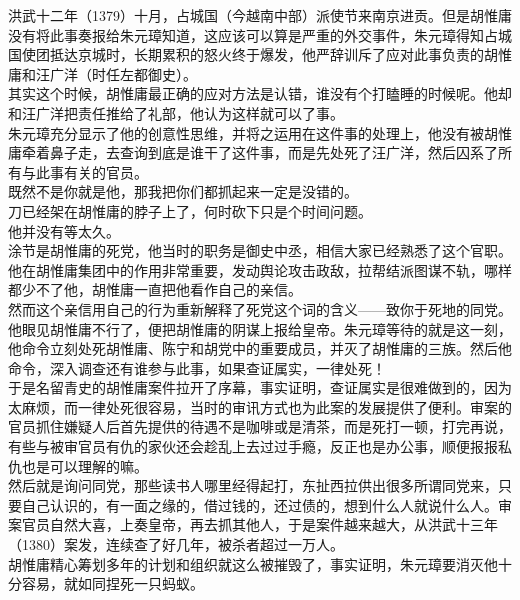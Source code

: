 \begin{multicols}{\theparacolNo}
洪武十二年（1379）十月，占城国（今越南中部）派使节来南京进贡。但是胡惟庸没有将此事奏报给朱元璋知道，这应该可以算是严重的外交事件，朱元璋得知占城国使团抵达京城时，长期累积的怒火终于爆发，他严辞训斥了应对此事负责的胡惟庸和汪广洋（时任左都御史）。\\

其实这个时候，胡惟庸最正确的应对方法是认错，谁没有个打瞌睡的时候呢。他却和汪广洋把责任推给了礼部，他认为这样就可以了事。\\

朱元璋充分显示了他的创意性思维，并将之运用在这件事的处理上，他没有被胡惟庸牵着鼻子走，去查询到底是谁干了这件事，而是先处死了汪广洋，然后囚系了所有与此事有关的官员。\\

既然不是你就是他，那我把你们都抓起来一定是没错的。\\

刀已经架在胡惟庸的脖子上了，何时砍下只是个时间问题。\\

他并没有等太久。\\

涂节是胡惟庸的死党，他当时的职务是御史中丞，相信大家已经熟悉了这个官职。他在胡惟庸集团中的作用非常重要，发动舆论攻击政敌，拉帮结派图谋不轨，哪样都少不了他，胡惟庸一直把他看作自己的亲信。\\

然而这个亲信用自己的行为重新解释了死党这个词的含义——致你于死地的同党。\\

他眼见胡惟庸不行了，便把胡惟庸的阴谋上报给皇帝。朱元璋等待的就是这一刻，他命令立刻处死胡惟庸、陈宁和胡党中的重要成员，并灭了胡惟庸的三族。然后他命令，深入调查还有谁参与此事，如果查证属实，一律处死！\\

于是名留青史的胡惟庸案件拉开了序幕，事实证明，查证属实是很难做到的，因为太麻烦，而一律处死很容易，当时的审讯方式也为此案的发展提供了便利。审案的官员抓住嫌疑人后首先提供的待遇不是咖啡或是清茶，而是死打一顿，打完再说，有些与被审官员有仇的家伙还会趁乱上去过过手瘾，反正也是办公事，顺便报报私仇也是可以理解的嘛。\\

然后就是询问同党，那些读书人哪里经得起打，东扯西拉供出很多所谓同党来，只要自己认识的，有一面之缘的，借过钱的，还过债的，想到什么人就说什么人。审案官员自然大喜，上奏皇帝，再去抓其他人，于是案件越来越大，从洪武十三年（1380）案发，连续查了好几年，被杀者超过一万人。\\

胡惟庸精心筹划多年的计划和组织就这么被摧毁了，事实证明，朱元璋要消灭他十分容易，就如同捏死一只蚂蚁。\\


\end{multicols}
